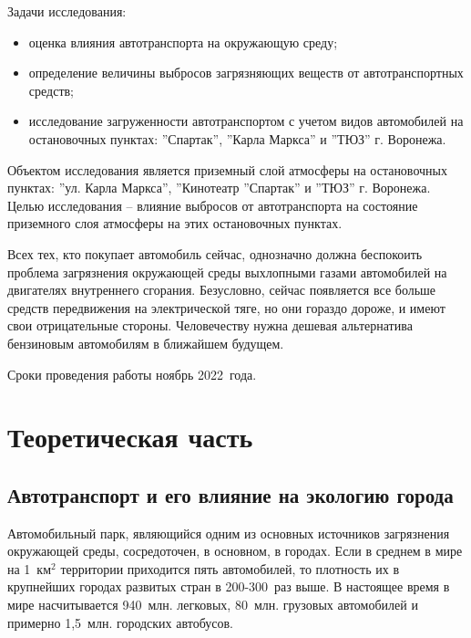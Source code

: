 Задачи исследования:
\begin{itemize}
\item оценка влияния автотранспорта на окружающую среду;
\item определение величины выбросов загрязняющих веществ от автотранспортных средств;
\item исследование загруженности автотранспортом с учетом видов автомобилей на остановочных пунктах: ''Спартак'', ''Карла Маркса'' и ''ТЮЗ'' г. Воронежа.
\end{itemize}

Объектом исследования является приземный слой атмосферы на остановочных пунктах: ''ул. Карла Маркса'', ''Кинотеатр ''Спартак'' и ''ТЮЗ'' г. Воронежа. Целью исследования – влияние выбросов от автотранспорта на состояние приземного слоя атмосферы на этих остановочных пунктах.

Всех тех, кто покупает автомобиль сейчас, однозначно должна беспокоить проблема загрязнения окружающей среды выхлопными газами автомобилей на двигателях внутреннего сгорания. Безусловно, сейчас появляется все больше средств передвижения на электрической тяге, но они гораздо дороже, и имеют свои отрицательные стороны. Человечеству нужна дешевая альтернатива бензиновым автомобилям в ближайшем будущем.

Сроки проведения работы ноябрь 2022~года.







\section{Теоретическая часть}

\subsection{Автотранспорт и его влияние на экологию города}

Автомобильный парк, являющийся одним из основных источников загрязнения окружающей среды, сосредоточен, в основном, в городах. Если в среднем в мире на 1~км$^2$ территории приходится пять автомобилей, то плотность их в крупнейших городах развитых стран в 200-300~раз выше. В настоящее время в мире насчитывается 940~млн. легковых, 80~млн. грузовых автомобилей и примерно 1,5~млн. городских автобусов.

